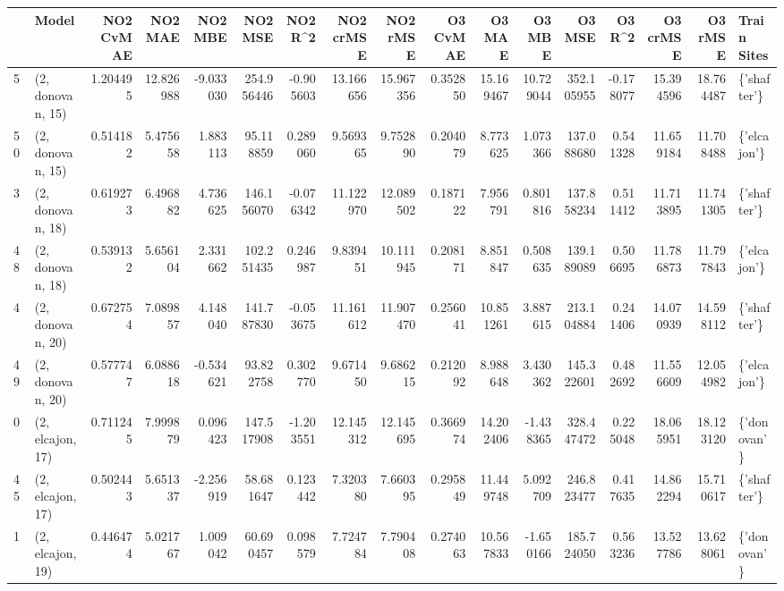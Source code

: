 \begin{tabular}{llrrrrrrrrrrrrrrl}
\toprule
{} &             Model &  NO2 CvMAE &    NO2 MAE &   NO2 MBE &     NO2 MSE &   NO2 R\textasciicircum 2 &  NO2 crMSE &   NO2 rMSE &  O3 CvMAE &     O3 MAE &     O3 MBE &      O3 MSE &    O3 R\textasciicircum 2 &   O3 crMSE &    O3 rMSE &  Train Sites \\
\midrule
5  &  (2, donovan, 15) &   1.204495 &  12.826988 & -9.033030 &  254.956446 & -0.905603 &  13.166656 &  15.967356 &  0.352850 &  15.169467 &  10.729044 &  352.105955 & -0.178077 &  15.394596 &  18.764487 &  \{'shafter'\} \\
50 &  (2, donovan, 15) &   0.514182 &   5.475658 &  1.883113 &   95.118859 &  0.289060 &   9.569365 &   9.752890 &  0.204079 &   8.773625 &   1.073366 &  137.088680 &  0.541328 &  11.659184 &  11.708488 &  \{'elcajon'\} \\
3  &  (2, donovan, 18) &   0.619273 &   6.496882 &  4.736625 &  146.156070 & -0.076342 &  11.122970 &  12.089502 &  0.187122 &   7.956791 &   0.801816 &  137.858234 &  0.511412 &  11.713895 &  11.741305 &  \{'shafter'\} \\
48 &  (2, donovan, 18) &   0.539132 &   5.656104 &  2.331662 &  102.251435 &  0.246987 &   9.839451 &  10.111945 &  0.208171 &   8.851847 &   0.508635 &  139.189089 &  0.506695 &  11.786873 &  11.797843 &  \{'elcajon'\} \\
4  &  (2, donovan, 20) &   0.672754 &   7.089857 &  4.148040 &  141.787830 & -0.053675 &  11.161612 &  11.907470 &  0.256041 &  10.851261 &   3.887615 &  213.104884 &  0.241406 &  14.070939 &  14.598112 &  \{'shafter'\} \\
49 &  (2, donovan, 20) &   0.577747 &   6.088618 & -0.534621 &   93.822758 &  0.302770 &   9.671450 &   9.686215 &  0.212092 &   8.988648 &   3.430362 &  145.322601 &  0.482692 &  11.556609 &  12.054982 &  \{'elcajon'\} \\
0  &  (2, elcajon, 17) &   0.711245 &   7.999879 &  0.096423 &  147.517908 & -1.203551 &  12.145312 &  12.145695 &  0.366974 &  14.202406 &  -1.438365 &  328.447472 &  0.225048 &  18.065951 &  18.123120 &  \{'donovan'\} \\
45 &  (2, elcajon, 17) &   0.502443 &   5.651337 & -2.256919 &   58.681647 &  0.123442 &   7.320380 &   7.660395 &  0.295849 &  11.449748 &   5.092709 &  246.823477 &  0.417635 &  14.862294 &  15.710617 &  \{'shafter'\} \\
1  &  (2, elcajon, 19) &   0.446474 &   5.021767 &  1.009042 &   60.690457 &  0.098579 &   7.724784 &   7.790408 &  0.274063 &  10.567833 &  -1.650166 &  185.724050 &  0.563236 &  13.527786 &  13.628061 &  \{'donovan'\} \\

\end{tabular}
